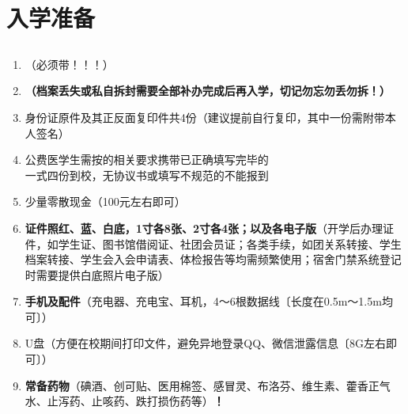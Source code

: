 \section[入学准备]{入学准备}

\subsection[必要证件及物品]{}
\begin{enumerate}
    \item \textbf{}（必须带！！！）
    \item \textbf{（档案丢失或私自拆封需要全部补办完成后再入学，切记勿忘勿丢勿拆！）}
    \item 身份证原件及其正反面复印件共4份（建议提前自行复印，其中一份需附带本人签名）
    \item 公费医学生需按的相关要求携带已正确填写完毕的\\%
          一式四份到校，无协议书或填写不规范的不能报到\footnotemark
    \item 少量零散现金（100元左右即可）\footnotemark
    \item \textbf{证件照红、蓝、白底，1寸各8张、2寸各4张；以及各电子版}（开学后办理证件，如学生证、图书馆借阅证、社团会员证；各类手续，如团关系转接、学生档案转接、学生会入会申请表、体检报告等均需频繁使用；宿舍门禁系统登记时需要提供白底照片电子版）
    \item \textbf{手机及配件}（充电器、充电宝、耳机，4～6根数据线〔长度在0.5m～1.5m均可〕）
    \item U盘（方便在校期间打印文件，避免异地登录QQ、微信泄露信息〔8G左右即可〕）
    \item \textbf{常备药物}（碘酒、创可贴、医用棉签、感冒灵、布洛芬、维生素、藿香正气水、止泻药、止咳药、跌打损伤药等）\textbf{！}
\end{enumerate}

